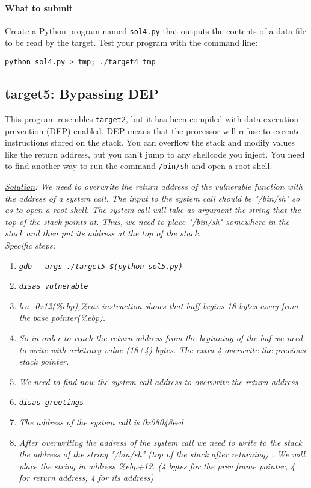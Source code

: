 \documentclass[letterpaper,12pt]{report}
\begin{document}
{\begin{enumerate}
\end{enumerate}

\paragraph{What to submit}
Create a Python program named \texttt{sol4.py} that outputs the contents of a data file to be read by the target.  Test your program with the command line:

\smallskip

\quad\texttt{python sol4.py > tmp; ./target4 tmp}

\subsection*{target5: Bypassing DEP } 
\label{sec:target5}

This program resembles \texttt{target2}, but it has been compiled with data execution prevention (DEP) enabled.  DEP means that the processor will refuse to execute instructions stored on the stack.  You can overflow the stack and modify values like the return address, but you can't jump to any shellcode you inject.  You need to find another way to run the command \texttt{/bin/sh} and open a root shell.

\smallskip

\textit{\underline{Solution}: We need to overwrite the return address of the vulnerable function with the address of a system call. The input to the system call should be "/bin/sh" so as to open a root shell. The system call will take as argument the string that the top of the stack points at. Thus, we need to place "/bin/sh" somewhere in the stack and then put its address at the top of the stack. \\
Specific steps:
}
\begin{enumerate}
\item \textit{\texttt{gdb -{}-args ./target5 \$(python sol5.py)}}
\item \textit{\texttt{disas vulnerable}}
\item \textit{lea  -0x12(\%ebp),\%eax instruction shows that buff begins 18 bytes away from the base pointer(\%ebp).}   
\item \textit{So in order to reach the return address from the beginning of the buf we need to write with arbitrary value (18+4) bytes. The extra 4 overwrite the previous stack pointer. }
\item \textit{We need to find now the system call address to overwrite the return address}
\item \textit{\texttt{disas greetings}}
\item \textit{The address of the system call is 0x08048eed}
\item \textit{After overwriting the address of the system call we need to write to the stack the address of the string "/bin/sh" (top of the stack after returning) . We will place the string in address \%ebp+12. (4 bytes for the prev frame pointer, 4 for return address, 4 for its address)}
\end{enumerate}



}
\end{document}
